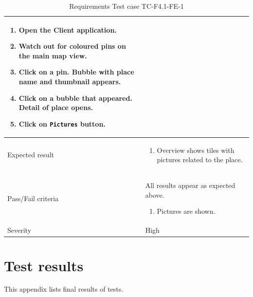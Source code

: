 \documentclass[11pt]{book}
\begin{document}
\begin{table}
\begin{tabular}{| p{3cm} | p{9.5cm} |}
                            \begin{enumerate}
                              \item Open the Client application.
                              \item Watch out for coloured pins on the main map view.
                              \item Click on a pin. Bubble with place name and thumbnail appears.
                              \item Click on a bubble that appeared. Detail of place opens.
                              \item Click on \texttt{Pictures} button.
                            \end{enumerate} \\ \hline 
    Expected result       & \begin{enumerate}
                              \item Overview shows tiles with pictures related to the place.
                            \end{enumerate} \\ \hline 
    Pass/Fail criteria    & All results appear as expected above.
                            \begin{enumerate}
                              \item Pictures are shown.
                            \end{enumerate} \\ \hline 
    Severity              & High \\ \hline 
  \end{tabular}
  \caption{Requirements Test case TC-F4.1-FE-1}
  \label{tab:TCF4.1FE1}
\end{table}


\chapter{Test results}\label{appendix:testresults}  

This appendix lists final results of tests.

\end{document}
